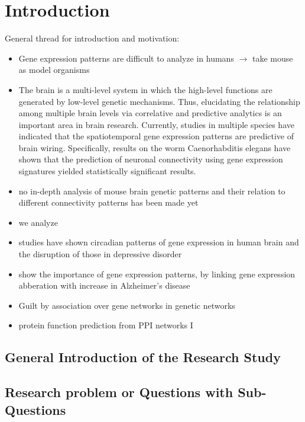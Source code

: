 \documentclass[]{article}
\renewcommand{\cite}{\citep}
\begin{document}
\section{Introduction}
\label{sec:introduction}
General thread for introduction and motivation:
\begin{itemize}
	\item Gene expression patterns are difficult to analyze in humans $\rightarrow$ take mouse as model organisms
	\item The brain is a multi-level system in which the high-level functions are generated by low-level genetic mechanisms. Thus, elucidating the relationship among multiple brain levels via correlative and predictive analytics is an important area in brain research. Currently, studies in multiple species have indicated that the spatiotemporal gene expression patterns are predictive of brain wiring. Specifically, results on the worm Caenorhabditis elegans have shown that the prediction of neuronal connectivity using gene expression signatures yielded statistically significant results.
	\item no in-depth analysis of mouse brain genetic patterns and their relation to different connectivity patterns has been made yet
	\item we analyze 
	
	\item studies have shown circadian patterns of gene expression in human brain and the disruption of those in depressive disorder \cite{li2013circadian}
	\item \cite{twine2011whole} show the importance of gene expression patterns, by linking gene expression abberation with increase in Alzheimer's disease
	
	\item Guilt by association over gene networks \cite{Oliver2000, Gillis2012} in genetic networks
	\item protein function prediction from PPI networks \cite{Vazquez2003}I
\end{itemize}

\subsection*{General Introduction of the Research Study}

\subsection*{Research problem or Questions with Sub-Questions}
\end{document}
